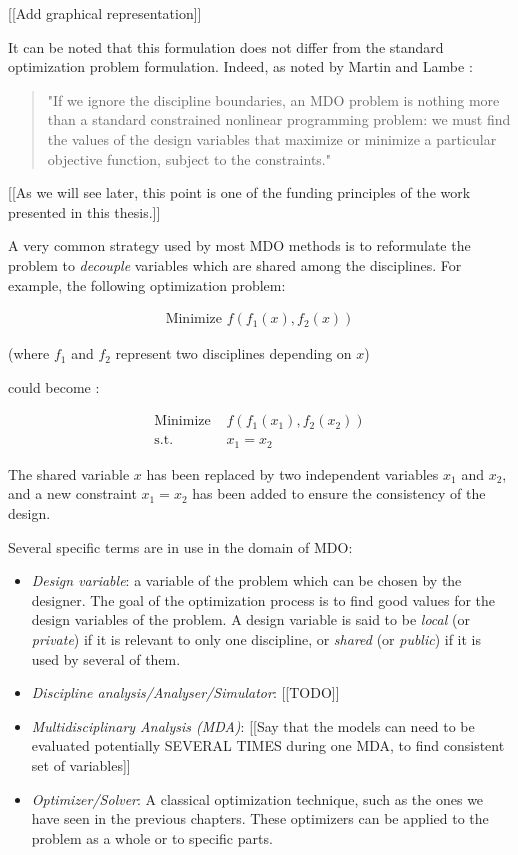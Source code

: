 [[Add graphical representation]]

It can be noted that this formulation does not differ from the standard optimization problem formulation. Indeed, as noted by Martin and Lambe \cite{Lambe:2011:A}:
 \begin{quote}
 "If we ignore the discipline boundaries, an MDO problem is nothing more than a standard constrained nonlinear programming problem: we must find the values of the design variables that maximize or minimize a particular objective function, subject to the constraints."
\end{quote}
[[As we will see later, this point is one of the funding principles of the work presented in this thesis.]]

A very common strategy used by most MDO methods is to reformulate the problem to \emph{decouple} variables which are shared among the disciplines. 
For example, the following optimization problem:

\begin{align*}
\text{Minimize } f(f_1(x), f_2(x))
\end{align*}

(where $f_1$ and $f_2$ represent two disciplines depending on $x$)

could become :

\begin{align*}
\text{Minimize } &f(f_1(x_1), f_2(x_2))\\
\text{s.t. } &x_1=x_2
\end{align*}

The shared variable $x$ has been replaced by two independent variables $x_1$ and $x_2$, and a new constraint $x_1=x_2$ has been added to ensure the consistency of the design.


Several specific terms are in use in the domain of MDO:

\begin{itemize}

\item \emph{Design variable}: a variable of the problem which can be chosen by the designer. The goal of the optimization process is to find good values for the design variables of the problem. A design variable is said to be \emph{local} (or \emph{private}) if it is relevant to only one discipline, or \emph{shared} (or \emph{public}) if it is used by several of them.

\item \emph{Discipline analysis/Analyser/Simulator}: [[TODO]]

\item \emph{Multidisciplinary Analysis (MDA)}: [[Say that the models can need to be evaluated potentially SEVERAL TIMES during one MDA, to find consistent set of variables]]

\item \emph{Optimizer/Solver}: A classical optimization technique, such as the ones we have seen in the previous chapters. These optimizers can be applied to the problem as a whole or to specific parts.

\end{itemize}



